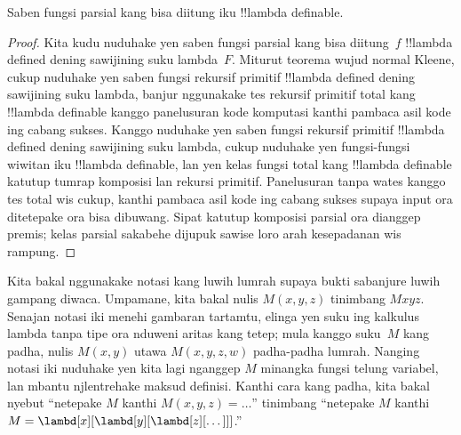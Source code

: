 \documentclass[../../../include/open-logic-section]{subfiles}
\begin{document}

\begin{thm}
Saben fungsi parsial kang bisa diitung iku
!!{lambda definable}.
\end{thm}

\begin{proof}
Kita kudu nuduhake yen saben fungsi parsial kang
bisa diitung~$f$ !!{lambda defined} dening sawijining
suku lambda~$F$. Miturut teorema wujud normal
Kleene, cukup nuduhake yen saben fungsi rekursif
primitif !!{lambda defined} dening sawijining suku
lambda, banjur nggunakake tes rekursif primitif total kang
!!{lambda definable} kanggo panelusuran kode komputasi kanthi pambaca asil kode ing cabang sukses. Kanggo
nuduhake yen saben fungsi rekursif primitif
!!{lambda defined} dening sawijining suku lambda,
cukup nuduhake yen fungsi-fungsi wiwitan iku
!!{lambda definable}, lan yen kelas fungsi total
kang !!{lambda definable} katutup tumrap komposisi lan
rekursi primitif. Panelusuran tanpa wates kanggo tes total wis cukup, kanthi pambaca asil kode ing cabang sukses supaya input ora ditetepake ora bisa dibuwang. Sipat katutup komposisi parsial ora dianggep premis; kelas parsial sakabehe dijupuk sawise loro arah kesepadanan wis rampung.
\end{proof}

Kita bakal nggunakake notasi kang luwih lumrah
supaya bukti sabanjure luwih gampang diwaca.
Umpamane, kita bakal nulis $M(x, y, z)$
tinimbang $Mxyz$. Senajan notasi iki menehi
gambaran tartamtu, elinga yen suku ing
kalkulus lambda tanpa tipe ora nduweni
aritas kang tetep; mula kanggo suku~$M$
kang padha, nulis $M(x,y)$ utawa
$M(x,y,z,w)$ padha-padha lumrah.
Nanging notasi iki nuduhake yen kita lagi
nganggep $M$ minangka fungsi telung variabel,
lan mbantu njlentrehake maksud definisi.
Kanthi cara kang padha, kita bakal nyebut
``netepake $M$ kanthi $M(x,y,z) = \dots$''
tinimbang ``netepake $M$ kanthi $M =
\lambd[x][\lambd[y][\lambd[z][\dots]]]$.''
\end{document}
